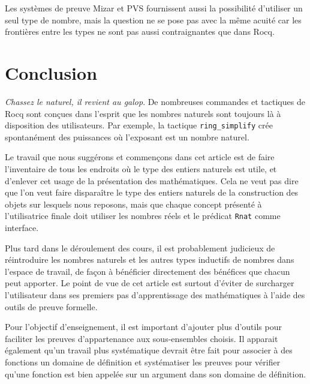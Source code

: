 \documentclass{modjflart}
\begin{document}
Les systèmes de preuve Mizar \cite{Mizar-beyond2015} et PVS
\cite{PVS11} fournissent aussi
la possibilité d'utiliser un seul type de nombre, mais la question ne
se pose pas avec la même acuité car les frontières entre les types ne
sont pas aussi contraignantes que dans Rocq.

\section{Conclusion}
{\em Chassez le naturel, il revient au galop}.  De nombreuses commandes
et tactiques de Rocq sont conçues dans l'esprit que les nombres naturels
sont toujours là à disposition des utilisateurs.  Par exemple, la tactique
\texttt{ring\_simplify} crée spontanément des puissances où l'exposant est un
nombre naturel.

Le travail que nous suggérons et commençons dans cet article est de
faire l'inventaire de tous les endroits où le type des entiers
naturels est utile, et d'enlever cet usage de la présentation des
mathématiques.  Cela ne veut pas dire
que l'on veut faire disparaître le type des entiers naturels de la
construction des objets sur lesquels nous reposons, mais que chaque
concept présenté à l'utilisatrice finale doit utiliser les nombres
réels et le prédicat \texttt{Rnat} comme interface.

Plus tard dans le déroulement des cours, il est probablement
judicieux de réintroduire les
nombres naturels et les autres types inductifs de nombres dans
l'espace de travail, de façon à bénéficier directement des bénéfices
que chacun peut apporter.  Le point de vue de cet article est surtout
d'éviter de surcharger l'utilisateur dans ses premiers pas
d'apprentissage des mathématiques à l'aide des outils de preuve
formelle.

Pour l'objectif d'enseignement, il est important d'ajouter
plus d'outils pour faciliter les preuves d'appartenance aux
sous-ensembles choisis.  Il apparait également qu'un travail plus
systématique devrait être fait pour associer à des fonctions un
domaine de définition et systématiser les preuves pour vérifier qu'une
fonction est bien appelée sur un argument dans son domaine de
définition.



\end{document}
